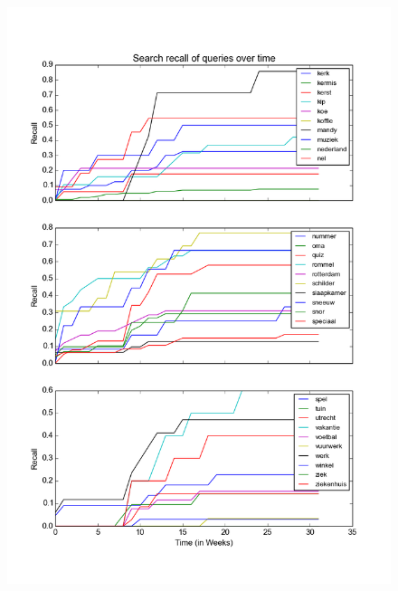 \begin{figure}[H]
\centering
\includegraphics[width=\textwidth]{appendixc/recallovertime20}
\end{figure}